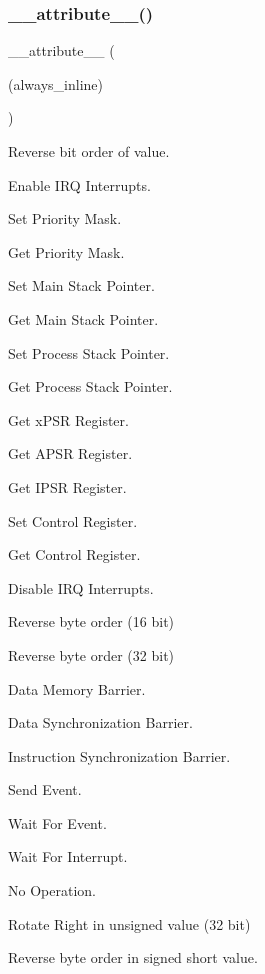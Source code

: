 \subsubsection{\texorpdfstring{\+\_\+\+\_\+attribute\+\_\+\+\_\+()}{\_\_attribute\_\_()}\hspace{0.1cm}{\footnotesize\ttfamily [3/3]}}
{\footnotesize\ttfamily \+\_\+\+\_\+attribute\+\_\+\+\_\+ (\begin{DoxyParamCaption}\item[{(always\+\_\+inline)}]{ }\end{DoxyParamCaption})}



Reverse bit order of value. 

Enable I\+RQ Interrupts.

Set Priority Mask.

Get Priority Mask.

Set Main Stack Pointer.

Get Main Stack Pointer.

Set Process Stack Pointer.

Get Process Stack Pointer.

Get x\+P\+SR Register.

Get A\+P\+SR Register.

Get I\+P\+SR Register.

Set Control Register.

Get Control Register.

Disable I\+RQ Interrupts.

Reverse byte order (16 bit)

Reverse byte order (32 bit)

Data Memory Barrier.

Data Synchronization Barrier.

Instruction Synchronization Barrier.

Send Event.

Wait For Event.

Wait For Interrupt.

No Operation.

Rotate Right in unsigned value (32 bit)

Reverse byte order in signed short value.

